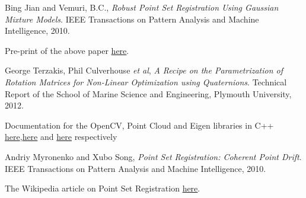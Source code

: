 \documentclass[11pt, a4paper]{article}
\begin{document}
\begin{thebibliography}{9}

  Bing Jian and Vemuri, B.C.,
  \emph{Robust Point Set Registration Using Gaussian Mixture Models}.
  IEEE Transactions on Pattern Analysis and Machine Intelligence,
  2010.
  
  Pre-print of the above paper \href{http://code.google.com/p/gmmreg/downloads/detail?name=gmmreg_PAMI_preprint.pdf}{here}.
  
  George Terzakis, Phil Culverhouse \textit{et al},
  \emph{A Recipe on the Parametrization of Rotation Matrices for Non-Linear Optimization using Quaternions}.
  Technical Report of the School of Marine Science and Engineering, Plymouth University,
  2012.
  
  Documentation for the OpenCV, Point Cloud and Eigen libraries in C++ \href{http://docs.opencv.org/}{here},\href{http://pointclouds.org/documentation/}{here} and \href{http://eigen.tuxfamily.org/dox/}{here} respectively

  Andriy Myronenko and Xubo Song,
  \emph{Point Set Registration: Coherent Point Drift}.
  IEEE Transactions on Pattern Analysis and Machine Intelligence,
  2010.

  The Wikipedia article on Point Set Registration \href{http://en.wikipedia.org/wiki/Point_set_registration}{here}.

\end{thebibliography}
\end{document}
